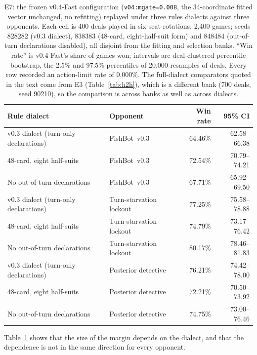 \documentclass[11pt]{article}
\theoremstyle{definition}
\DeclareRobustCommand{\vfast}{\texorpdfstring{\mbox{v0.4-Fast}}{v0.4-Fast}}
\DeclareRobustCommand{\vthree}{\texorpdfstring{\mbox{FishBot v0.3}}{FishBot v0.3}}
\newcommand{\numHtHDeals}{700}
\newcommand{\numLimitRate}{0.000\%}
\newcommand{\numParams}{34}
\newcommand{\numBootstrapDraws}{20{,}000}
\newcommand{\numEsevenDeals}{400}
\newcommand{\numEsevenGames}{2{,}400}
\begin{document}
\begin{table}[ht]
\centering
\caption{E7: the frozen \vfast{} configuration (\texttt{v04:mgate=0.008}, the
\numParams{}-coordinate fitted vector unchanged, no refitting) replayed under
three rules dialects against three opponents. Each cell is \numEsevenDeals{}
deals played in six seat rotations, \numEsevenGames{} games; seeds 828282 (v0.3
dialect), 838383 (48-card, eight-half-suit form) and 848484 (out-of-turn
declarations disabled), all disjoint from the fitting and selection banks.
``Win rate'' is \vfast{}'s share of games won; intervals are deal-clustered
percentile bootstrap, the 2.5\% and 97.5\% percentiles of \numBootstrapDraws{}
resamples of deals. Every row recorded an action-limit rate of \numLimitRate.
The full-dialect comparators quoted in the text come from E3
(Table~\ref{tab:h2h}), which is a different bank (\numHtHDeals{} deals, seed
90210), so the comparison is across banks as well as across dialects.}
\label{tab:rules}
\small
\begin{tabular}{llrr}
\toprule
Rule dialect & Opponent & Win rate & 95\% CI \\
\midrule
v0.3 dialect (turn-only declarations) & \vthree{} & 64.46\% & 62.58--66.38 \\
48-card, eight half-suits & \vthree{} & 72.54\% & 70.79--74.21 \\
No out-of-turn declarations & \vthree{} & 67.71\% & 65.92--69.50 \\
v0.3 dialect (turn-only declarations) & Turn-starvation lockout & 77.25\% & 75.58--78.88 \\
48-card, eight half-suits & Turn-starvation lockout & 74.79\% & 73.17--76.42 \\
No out-of-turn declarations & Turn-starvation lockout & 80.17\% & 78.46--81.83 \\
v0.3 dialect (turn-only declarations) & Posterior detective & 76.21\% & 74.42--78.00 \\
48-card, eight half-suits & Posterior detective & 72.21\% & 70.50--73.92 \\
No out-of-turn declarations & Posterior detective & 74.75\% & 73.00--76.46 \\
\bottomrule
\end{tabular}%
\end{table}

Table~\ref{tab:rules} shows that the size of the margin depends on the dialect,
and that the dependence is not in the same direction for every opponent.
\end{document}
